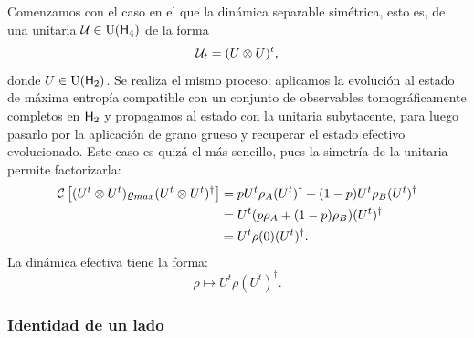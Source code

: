 Comenzamos con el caso en el que la dinámica separable simétrica, esto es, de una unitaria $\mathcal{U}\in\text{U}({\sf H}_{4})$ de la forma
\begin{equation*}
    \mathcal{U}_{t}=(U \otimes U)^{t},
\end{equation*}
donde $U\in\text{U}({\sf H}_{2})$. Se realiza el mismo proceso: aplicamos la evolución al estado de máxima entropía compatible con un conjunto de observables tomográficamente completos en ${\sf H}_{2}$ y propagamos al estado con la unitaria subytacente, para luego pasarlo por la aplicación de grano grueso y recuperar el estado efectivo evolucionado. Este caso es quizá el más sencillo, pues la simetría de la unitaria permite factorizarla:
\begin{align*}
\mathcal{C}\left[(U^{t}\otimes U^{t})\varrho_{max}(U^{t}\otimes U^{t})^{\dag}\right]&=pU^{t}\rho_{A}(U^{t})^{\dag}+(1-p)U^{t}\rho_{B}(U^{t})^{\dag} \\
&=U^{t}(p\rho_{A}+(1-p)\rho_{B})(U^{t})^{\dag}\\
&=U^{t}\rho(0)(U^{t})^{\dag}.
\end{align*}
La dinámica efectiva tiene la forma:
\begin{equation}
    \rho\mapsto U^{t}\rho(U^{t})^{\dag}.
\end{equation}

\subsubsection{Identidad de un lado}

